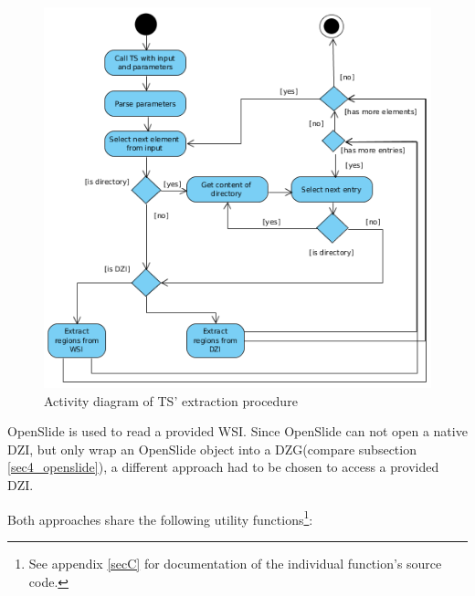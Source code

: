 \begin{figure}[H]
	\begin{center}
		\includegraphics[scale=0.6]{img/ts_run.png}
		\caption{Activity diagram of TS' extraction procedure}
		\label{fig5_tsRunUml}
	\end{center}
\end{figure}

OpenSlide is used to read a provided WSI. Since OpenSlide can not open a native DZI, but only wrap an OpenSlide object into a DZG(compare subsection \ref{sec4_openslide}), a different approach had to be chosen to access a provided DZI.

Both approaches share the following utility functions\footnote{
	See appendix \ref{secC} for documentation of the individual function's source code.
}:

